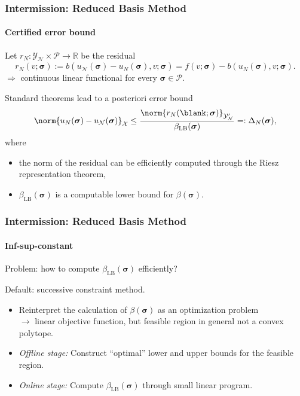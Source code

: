 \begin{frame}[t]
    \frametitle{Intermission: Reduced Basis Method}
    \framesubtitle{Certified error bound}
    Let $r_{N} \colon \mathcal Y_{\mathcal N} \times \mathcal P \to \mathbb{R}$ be the residual
    \begin{equation}
        r_{N}(v; \bm \sigma) := b(u_{\mathcal N}(\bm \sigma) - u_{N}(\bm \sigma), v; \bm \sigma) = f(v; \bm \sigma) - b(u_{N}(\bm \sigma), v; \bm \sigma).
    \end{equation}
    $\Rightarrow$ continuous linear functional for every $\bm \sigma \in \mathcal P$.

    Standard theorems lead to a posteriori error bound
    \begin{equation}
        \norm{u_{N}(\bm \sigma) - u_{\mathcal N}(\bm \sigma)}_{\mathcal X} \leq \frac{\norm{r_{N}(\blank; \bm \sigma)}_{\mathcal Y_{\mathcal N}'}}{\beta_{\mathrm{LB}}(\bm \sigma)} =: \Delta_{N}(\bm \sigma),
    \end{equation}
    where
    \begin{itemize}
        \item the norm of the residual can be efficiently computed through the Riesz representation theorem,
        \item $\beta_{\mathrm{LB}}(\bm \sigma)$ is a computable lower bound for $\beta(\bm \sigma)$.
    \end{itemize}
\end{frame}

\begin{frame}[t]
    \frametitle{Intermission: Reduced Basis Method}
    \framesubtitle{Inf-sup-constant}

    Problem: how to compute $\beta_{\mathrm{LB}}(\bm \sigma)$ efficiently?

    \vfill
    Default: successive constraint method.

    \begin{itemize}
        \item Reinterpret the calculation of $\beta(\bm \sigma)$ as an optimization problem
        \\$\rightarrow$ linear objective function, but feasible region in general not a convex polytope.
        \item {}\emph{Offline stage:} Construct \enquote{optimal} lower and upper bounds for the feasible region.
        \item {}\emph{Online stage:} Compute $\beta_{\mathrm{LB}}(\bm \sigma)$ through small linear program.
    \end{itemize}

    \vfill
\end{frame}

